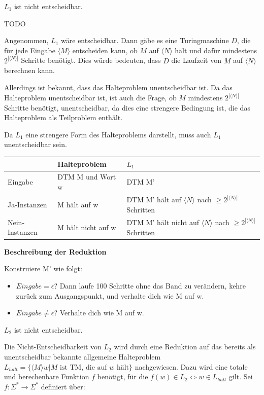 \begin{teile}
 
	\item 
	$L_{1}$ ist nicht entscheidbar.

	TODO

	Angenommen, $L_{1}$ wäre entscheidbar. Dann gäbe es eine Turingmaschine $D$, die für jede Eingabe $\langle M \rangle$ entscheiden kann, ob $M$ auf $\langle N \rangle$ hält und dafür mindestens $2^{|\langle N \rangle|}$ Schritte benötigt. Dies würde bedeuten, dass $D$ die Laufzeit von $M$ auf $\langle N \rangle$ berechnen kann. 

	Allerdings ist bekannt, dass das Halteproblem unentscheidbar ist. Da das Halteproblem unentscheidbar ist, ist auch die Frage, ob $M$ mindestens $2^{|\langle N \rangle|}$ Schritte benötigt, unentscheidbar, da dies eine strengere Bedingung ist, die das Halteproblem als Teilproblem enthält.

	Da $L_{1}$ eine strengere Form des Halteproblems darstellt, muss auch $L_{1}$ unentscheidbar sein.
	
	\begin{tabular}{|l|l|l|}
		\hline
		               & \textbf{Halteproblem} & \textbf{$L_1$} \\
		\hline
		Eingabe        & DTM M und Wort w      & DTM M' \\
		\hline 
		Ja-Instanzen   & M hält auf w          & DTM M' hält auf $\langle N \rangle$ nach $\geq 2^{|\langle N \rangle|}$ Schritten  \\ 
		\hline
		Nein-Instanzen & M hält nicht auf w    & DTM M' hält nicht auf $\langle N \rangle$ nach $\geq 2^{|\langle N \rangle|}$ Schritten \\
		\hline  
	\end{tabular}
	
	\textbf{Beschreibung der Reduktion}
	
	Konstruiere M' wie folgt:
	\begin{itemize}
		\item $Eingabe =  \epsilon$? Dann laufe 100 Schritte ohne das Band zu verändern, kehre zurück zum Ausgangspunkt, und verhalte dich wie M auf w.
		\item $Eingabe \neq \epsilon$? Verhalte dich wie M auf w.
	\end{itemize}
	
	\item 
	$L_{2}$ ist nicht entscheidbar.

	Die Nicht-Entscheidbarkeit von $L_2$ wird durch eine Reduktion auf das bereits als unentscheidbar bekannte allgemeine Halteproblem $L_{halt}=\{\langle M \rangle w | M \text{ ist TM, die auf } w \text{ hält} \}$ nachgewiesen. Dazu wird eine totale und berechenbare Funktion $f$ benötigt, für die $f(w) \in L_2 \Leftrightarrow w \in L_{halt}$ gilt. Sei $f:\Sigma^*\rightarrow \Sigma^*$ definiert über:


\end{teile}
